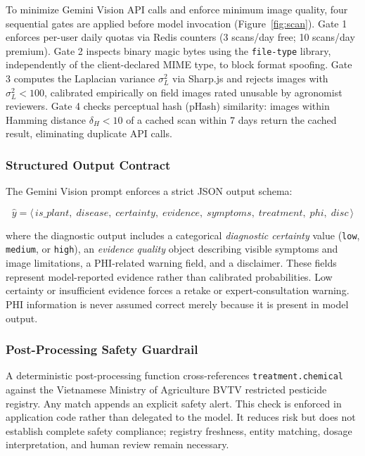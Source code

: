\documentclass[conference]{IEEEtran}
\begin{document}
To minimize Gemini Vision API calls and enforce minimum image quality,
four sequential gates are applied before model invocation
(Figure~\ref{fig:scan}). Gate 1 enforces per-user daily quotas via
Redis counters (3 scans/day free; 10 scans/day premium). Gate 2
inspects binary magic bytes using the \texttt{file-type} library,
independently of the client-declared MIME type, to block format
spoofing. Gate 3 computes the Laplacian variance $\sigma^2_L$ via
Sharp.js and rejects images with $\sigma^2_L < 100$, calibrated
empirically on field images rated unusable by agronomist reviewers.
Gate 4 checks perceptual hash (pHash) similarity: images within
Hamming distance $\delta_H < 10$ of a cached scan within 7 days
return the cached result, eliminating duplicate API calls.

\subsubsection{Structured Output Contract}

The Gemini Vision prompt enforces a strict JSON output schema:

\begin{equation}
  \hat{y} = \bigl\langle\,
    \mathit{is\_plant},\;
    \mathit{disease},\;
    \mathit{certainty},\;
    \mathit{evidence},\;
    \mathit{symptoms},\;
    \mathit{treatment},\;
    \mathit{phi},\;
    \mathit{disc}
  \,\bigr\rangle
  \label{eq:yhat}
\end{equation}

\noindent where the diagnostic output includes a categorical \textit{diagnostic certainty} value (\texttt{low}, \texttt{medium}, or \texttt{high}), an \textit{evidence quality} object describing visible symptoms and image limitations, a PHI-related warning field, and a disclaimer. These fields represent model-reported evidence rather than calibrated probabilities. Low certainty or insufficient evidence forces a retake or expert-consultation warning. PHI information is never assumed correct merely because it is present in model output.

\subsubsection{Post-Processing Safety Guardrail}

A deterministic post-processing function cross-references
\texttt{treatment.chemical} against the Vietnamese Ministry of
Agriculture BVTV restricted pesticide registry. Any match appends an explicit safety alert. This check is enforced in application code rather than delegated to the model. It reduces risk but does not establish complete safety compliance; registry freshness, entity matching, dosage interpretation, and human review remain necessary.
\end{document}
